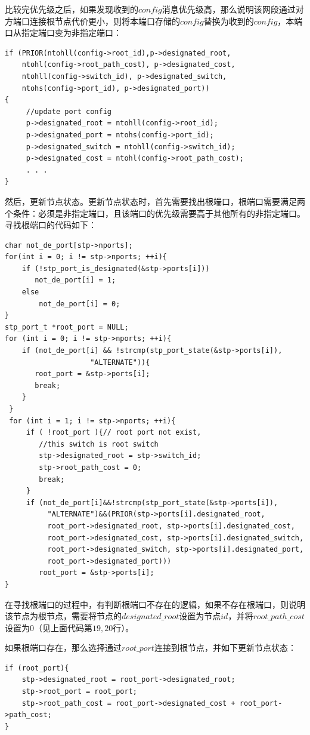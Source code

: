 \documentclass[UTF8,noindent]{ctexart}
\begin{document}
比较完优先级之后，如果发现收到的$config$消息优先级高，那么说明该网段通过对方端口连接根节点代价更小，则将本端口存储的$config$替换为收到的$config$，本端口从指定端口变为非指定端口：
\begin{lstlisting}
if (PRIOR(ntohll(config->root_id),p->designated_root,
    ntohl(config->root_path_cost), p->designated_cost,
    ntohll(config->switch_id), p->designated_switch,
    ntohs(config->port_id), p->designated_port))
{
     //update port config
     p->designated_root = ntohll(config->root_id);
     p->designated_port = ntohs(config->port_id);
     p->designated_switch = ntohll(config->switch_id);
     p->designated_cost = ntohl(config->root_path_cost);
	 . . .
}
\end{lstlisting}

然后，更新节点状态。更新节点状态时，首先需要找出根端口，根端口需要满足两个条件：必须是非指定端口，且该端口的优先级需要高于其他所有的非指定端口。寻找根端口的代码如下：
\begin{lstlisting}
char not_de_port[stp->nports];
for(int i = 0; i != stp->nports; ++i){
    if (!stp_port_is_designated(&stp->ports[i]))
       not_de_port[i] = 1;
    else
        not_de_port[i] = 0;                                                                                                                     
}
stp_port_t *root_port = NULL;
for (int i = 0; i != stp->nports; ++i){
    if (not_de_port[i] && !strcmp(stp_port_state(&stp->ports[i]), 
	                "ALTERNATE")){
       root_port = &stp->ports[i];
       break;
    }
 }
 for (int i = 1; i != stp->nports; ++i){
     if ( !root_port ){// root port not exist, 
        //this switch is root switch
        stp->designated_root = stp->switch_id;
        stp->root_path_cost = 0;
        break;
     }
     if (not_de_port[i]&&!strcmp(stp_port_state(&stp->ports[i]),
          "ALTERNATE")&&(PRIOR(stp->ports[i].designated_root, 
          root_port->designated_root, stp->ports[i].designated_cost,
          root_port->designated_cost, stp->ports[i].designated_switch,
          root_port->designated_switch, stp->ports[i].designated_port,
          root_port->designated_port)))
        root_port = &stp->ports[i];
}
\end{lstlisting}

在寻找根端口的过程中，有判断根端口不存在的逻辑，如果不存在根端口，则说明该节点为根节点，需要将节点的$designated\_root$设置为节点$id$，并将$root\_path\_cost$设置为$0$（见上面代码第$19,20$行）。

如果根端口存在，那么选择通过$root\_port$连接到根节点，并如下更新节点状态：
\begin{lstlisting}
if (root_port){
    stp->designated_root = root_port->designated_root;
    stp->root_port = root_port;
    stp->root_path_cost = root_port->designated_cost + root_port->path_cost;
}
\end{lstlisting}
\end{document}
